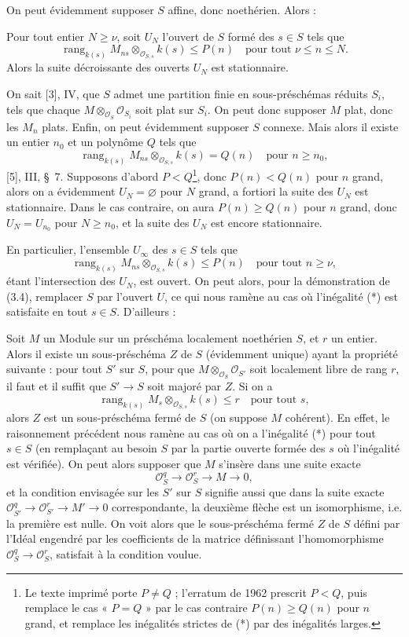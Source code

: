 On peut évidemment supposer $S$ affine, donc noethérien. Alors :

 Pour tout entier $N\geq\nu$, soit $U_N$ l'ouvert de $S$
formé des $s\in S$ tels que
\[
\operatorname{rang}_{k(s)}
M_{ns}\otimes_{\mathcal O_{S,s}}k(s)\leq P(n)
\quad\text{pour tout $\nu\leq n\leq N$}.
\]
Alors la suite décroissante des ouverts $U_N$ est stationnaire.

On sait [3], IV, que $S$ admet une partition finie en sous-préschémas réduits
$S_i$, tels que chaque $M\otimes_{\mathcal O_S}\mathcal O_{S_i}$ soit plat sur
$S_i$. On peut donc supposer $M$ plat, donc les $M_n$ plats. Enfin, on peut
évidemment supposer $S$ connexe. Mais alors il existe un entier $n_0$ et un
polynôme $Q$ tels que
\[
\operatorname{rang}_{k(s)}
M_{ns}\otimes_{\mathcal O_{S,s}}k(s)=Q(n)
\quad\text{pour $n\geq n_0$},
\]
[5], III, \S~7. Supposons d'abord $P<Q$\footnote{Le texte imprimé porte
$P\neq Q$ ; l'erratum de 1962 prescrit $P<Q$, puis remplace le cas « $P=Q$ »
par le cas contraire $P(n)\geq Q(n)$ pour $n$ grand, et remplace les
inégalités strictes de (*) par des inégalités larges.}, donc
$P(n)<Q(n)$ pour $n$ grand, alors on a évidemment $U_N=\varnothing$ pour $N$
grand, a fortiori la suite des $U_N$ est stationnaire. Dans le cas contraire,
on aura $P(n)\geq Q(n)$ pour $n$ grand, donc $U_N=U_{n_0}$ pour $N\geq n_0$,
et la suite des $U_N$ est encore stationnaire.

En particulier, l'ensemble $U_\infty$ des $s\in S$ tels que
\[
\tag{*}
\operatorname{rang}_{k(s)}
M_{ns}\otimes_{\mathcal O_{S,s}}k(s)\leq P(n)
\quad\text{pour tout $n\geq\nu$},
\]
étant l'intersection des $U_N$, est ouvert. On peut alors, pour la démonstration
de (3.4), remplacer $S$ par l'ouvert $U$, ce qui nous ramène au cas où
l'inégalité (*) est satisfaite en tout $s\in S$. D'ailleurs :

 Soit $M$ un Module sur un préschéma localement noethérien
$S$, et $r$ un entier. Alors il existe un sous-préschéma $Z$ de $S$
(évidemment unique) ayant la propriété suivante : pour tout $S'$ sur $S$, pour
que $M\otimes_{\mathcal O_S}\mathcal O_{S'}$ soit localement libre de rang $r$,
il faut et il suffit que $S'\longrightarrow S$ soit majoré par $Z$. Si on a
\[
\operatorname{rang}_{k(s)}
M_s\otimes_{\mathcal O_{S,s}}k(s)\leq r
\quad\text{pour tout $s$},
\]
alors $Z$ est un sous-préschéma fermé de $S$ (on suppose $M$ cohérent).
En effet, le raisonnement précédent nous ramène au cas où on a l'inégalité (*)
pour tout $s\in S$ (en remplaçant au besoin $S$ par la partie ouverte formée
des $s$ où l'inégalité est vérifiée). On peut alors supposer que $M$ s'insère
dans une suite exacte
\[
\mathcal O_S^q\longrightarrow\mathcal O_S^r\longrightarrow M\longrightarrow0,
\]
et la condition envisagée sur les $S'$ sur $S$ signifie aussi que dans la suite
exacte $\mathcal O_{S'}^q\longrightarrow\mathcal O_{S'}^r
\longrightarrow M'\longrightarrow0$ correspondante, la deuxième flèche est un
isomorphisme, i.e. la première est nulle. On voit alors que le sous-préschéma
fermé $Z$ de $S$ défini par l'Idéal engendré par les coefficients de la matrice
définissant l'homomorphisme
$\mathcal O_S^q\longrightarrow\mathcal O_S^r$, satisfait à la condition voulue.

